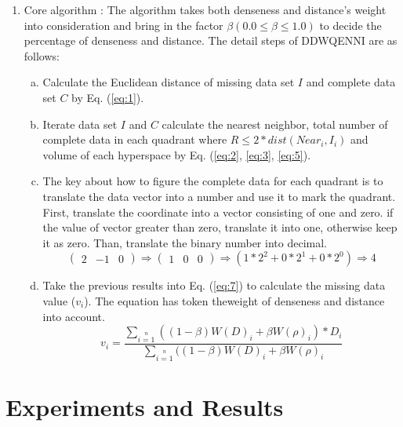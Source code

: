 \documentclass[print]{jicspack}
\begin{document}
\begin{enumerate}[(1)]
\item Core algorithm : The algorithm takes both denseness and distance's weight into consideration and bring in the factor $\beta (0.0 \leq \beta \leq 1.0)$ to decide the percentage of denseness and distance.  The detail steps of DDWQENNI are as follows:
\begin{enumerate}[a.]
  \item Calculate the Euclidean distance of missing data set $I$ and complete data set $C$ by Eq. (\ref{eq:1}).
  \item Iterate data set $I$ and $C$ calculate the nearest neighbor, total number of complete data in each quadrant where $R \leq 2 * dist(Near_i, I_i)$ and volume of each hyperspace by Eq. (\ref{eq:2}, \ref{eq:3}, \ref{eq:5}).
  \item The key about how to figure the complete data for each quadrant is to translate the data vector into a number and use it to mark the quadrant. First, translate the coordinate into a vector consisting of one and zero. if the value of vector greater than zero, translate it into one, otherwise keep it as zero. Than, translate the binary number into decimal.
  \begin{equation}
  \label{eq:6}
  \begin{pmatrix} 2& -1& 0\end{pmatrix}\Rightarrow \begin{pmatrix} 1& 0& 0\end{pmatrix} \Rightarrow (1*2^2 + 0*2^1+ 0*2^0) \Rightarrow 4
  \end{equation}
  \item Take the previous results into Eq. (\ref{eq:7}) to calculate the missing data value ($v_i$). The equation has token theweight of denseness and distance into account.
  \begin{equation}
  \label{eq:7}
  v_i = \frac{\sum\limits_{i=1}\limits^{n}((1-\beta)W(D)_i + \beta W(\rho)_i) * D_i}{\sum\limits_{i=1}\limits^{n}((1-\beta)W(D)_i + \beta W(\rho)_i}
  \end{equation}
\end{enumerate}
\end{enumerate}

\section{Experiments and Results}
\end{document}

